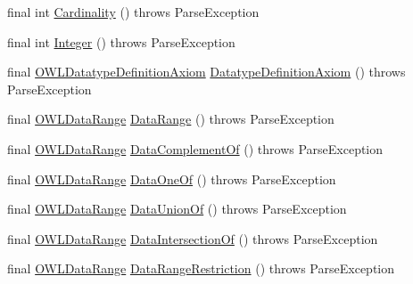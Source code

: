 \begin{DoxyCompactItemize}
\item 
final int \hyperlink{classorg_1_1coode_1_1owlapi_1_1functionalparser_1_1_o_w_l_functional_syntax_parser_a2d3da920df413ecd267309735139d178}{Cardinality} ()  throws Parse\-Exception 
\item 
final int \hyperlink{classorg_1_1coode_1_1owlapi_1_1functionalparser_1_1_o_w_l_functional_syntax_parser_acb67e5a77a4d729eee5d8936ca0fe3db}{Integer} ()  throws Parse\-Exception 
\item 
final \hyperlink{interfaceorg_1_1semanticweb_1_1owlapi_1_1model_1_1_o_w_l_datatype_definition_axiom}{O\-W\-L\-Datatype\-Definition\-Axiom} \hyperlink{classorg_1_1coode_1_1owlapi_1_1functionalparser_1_1_o_w_l_functional_syntax_parser_a473067926a46e0f2e60c13ec38cdc2a2}{Datatype\-Definition\-Axiom} ()  throws Parse\-Exception 
\item 
final \hyperlink{interfaceorg_1_1semanticweb_1_1owlapi_1_1model_1_1_o_w_l_data_range}{O\-W\-L\-Data\-Range} \hyperlink{classorg_1_1coode_1_1owlapi_1_1functionalparser_1_1_o_w_l_functional_syntax_parser_ada2c8033912ddcbefe3332e3bc08fc1f}{Data\-Range} ()  throws Parse\-Exception 
\item 
final \hyperlink{interfaceorg_1_1semanticweb_1_1owlapi_1_1model_1_1_o_w_l_data_range}{O\-W\-L\-Data\-Range} \hyperlink{classorg_1_1coode_1_1owlapi_1_1functionalparser_1_1_o_w_l_functional_syntax_parser_a6c09b3e7014a7da04e0f1638896f431b}{Data\-Complement\-Of} ()  throws Parse\-Exception 
\item 
final \hyperlink{interfaceorg_1_1semanticweb_1_1owlapi_1_1model_1_1_o_w_l_data_range}{O\-W\-L\-Data\-Range} \hyperlink{classorg_1_1coode_1_1owlapi_1_1functionalparser_1_1_o_w_l_functional_syntax_parser_af0c4d5a30e348d03c397fc03b05c932c}{Data\-One\-Of} ()  throws Parse\-Exception 
\item 
final \hyperlink{interfaceorg_1_1semanticweb_1_1owlapi_1_1model_1_1_o_w_l_data_range}{O\-W\-L\-Data\-Range} \hyperlink{classorg_1_1coode_1_1owlapi_1_1functionalparser_1_1_o_w_l_functional_syntax_parser_af4192f8debd710ab806df8c4305f06db}{Data\-Union\-Of} ()  throws Parse\-Exception 
\item 
final \hyperlink{interfaceorg_1_1semanticweb_1_1owlapi_1_1model_1_1_o_w_l_data_range}{O\-W\-L\-Data\-Range} \hyperlink{classorg_1_1coode_1_1owlapi_1_1functionalparser_1_1_o_w_l_functional_syntax_parser_a470d222a306957cbadea60b591691a43}{Data\-Intersection\-Of} ()  throws Parse\-Exception 
\item 
final \hyperlink{interfaceorg_1_1semanticweb_1_1owlapi_1_1model_1_1_o_w_l_data_range}{O\-W\-L\-Data\-Range} \hyperlink{classorg_1_1coode_1_1owlapi_1_1functionalparser_1_1_o_w_l_functional_syntax_parser_a64a873202d1c33abe9a2289028ae6989}{Data\-Range\-Restriction} ()  throws Parse\-Exception 

\end{DoxyCompactItemize}
